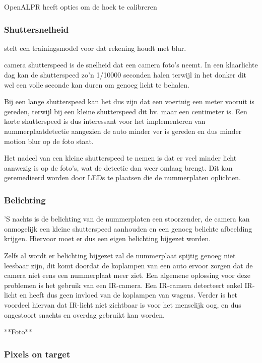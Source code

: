 OpenALPR heeft opties om de hoek te calibreren \autocite{openalprdocumentation}

\subsubsection{Shuttersnelheid}
\textcite{guo2017vehicle} stelt een trainingsmodel voor dat rekening houdt met blur.

camera shutterspeed is de snelheid dat een camera foto's neemt. In een klaarlichte dag kan de shutterspeed zo'n 1/10000 seconden halen terwijl in het donker dit wel een volle seconde kan duren om genoeg licht te behalen.

Bij een lange shutterspeed kan het dus zijn dat een voertuig een meter vooruit is gereden, terwijl bij een kleine shutterspeed dit bv. maar een centimeter is. Een korte shutterspeed is dus interessant voor het implementeren van nummerplaatdetectie aangezien de auto minder ver is gereden en dus minder motion blur op de foto staat.

Het nadeel van een kleine shutterspeed te nemen is dat er veel minder licht aanwezig is op de foto's, wat de detectie dan weer omlaag brengt. Dit kan geremedieerd worden door LEDs te plaatsen die de nummerplaten oplichten.

\subsubsection{Belichting}
'S nachts is de belichting van de nummerplaten een stoorzender, de camera kan onmogelijk een kleine shutterspeed aanhouden en een genoeg belichte afbeelding krijgen. Hiervoor moet er dus een eigen belichting bijgezet worden.

Zelfs al wordt er belichting bijgezet zal de nummerplaat spijtig genoeg niet leesbaar zijn, dit komt doordat de koplampen van een auto ervoor zorgen dat de camera niet eens een nummerplaat meer ziet. Een algemene oplossing voor deze problemen is het gebruik van een IR-camera. Een IR-camera detecteert enkel IR-licht en heeft dus geen invloed van de koplampen van wagens. Verder is het voordeel hiervan dat IR-licht niet zichtbaar is voor het menselijk oog, en dus ongestoort snachts en overdag gebruikt kan worden.

**Foto**

\subsubsection{Pixels on target}

